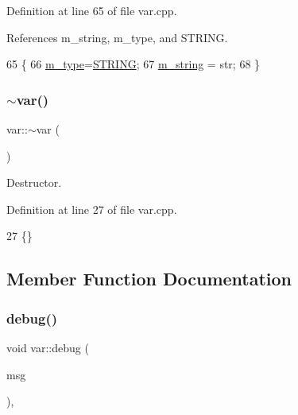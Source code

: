 Definition at line 65 of file var.\+cpp.



References m\+\_\+string, m\+\_\+type, and S\+T\+R\+I\+NG.


\begin{DoxyCode}
65                         \{
66   \hyperlink{classvar_afd0bde61955d8a7541d3dcedc22ec2ad}{m\_type}=\hyperlink{classvar_ae4f9e2c747c3e72f245b148146b1855ea7a154d7312f6d12c9031819ad3dfef71}{STRING};
67   \hyperlink{classvar_a81567a7f3af11ceee9a0624648e0e904}{m\_string} = str;
68 \}
\end{DoxyCode}
\mbox{\label{classvar_ac7d2944f98e9772ab540050ae22fe9d1}} 
\subsubsection{\texorpdfstring{$\sim$var()}{~var()}}
{\footnotesize\ttfamily var\+::$\sim$var (\begin{DoxyParamCaption}{ }\end{DoxyParamCaption})\hspace{0.3cm}{\ttfamily [virtual]}}



Destructor. 



Definition at line 27 of file var.\+cpp.


\begin{DoxyCode}
27 \{\} 
\end{DoxyCode}


\subsection{Member Function Documentation}
\mbox{\label{classvar_a90d3b799c7953db985d7488de79e247d}} 
\subsubsection{\texorpdfstring{debug()}{debug()}\hspace{0.1cm}{\footnotesize\ttfamily [1/2]}}
{\footnotesize\ttfamily void var\+::debug (\begin{DoxyParamCaption}\item[{std\+::string}]{msg }\end{DoxyParamCaption})\hspace{0.3cm}{\ttfamily [inline]}, {\ttfamily [private]}}




